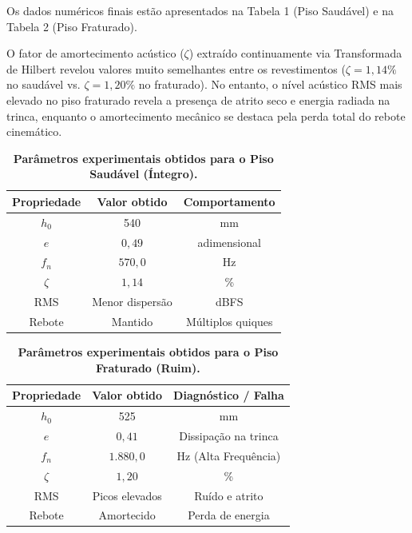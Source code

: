 \documentclass[10pt,twocolumn,fleqn]{article}
\begin{document}
	Os dados numéricos finais estão apresentados na Tabela 1 (Piso Saudável) e na Tabela 2 (Piso Fraturado).
	
	O fator de amortecimento acústico ($\zeta$) extraído continuamente via Transformada de Hilbert revelou valores muito semelhantes entre os revestimentos ($\zeta = 1{,}14\%$ no saudável vs. $\zeta = 1{,}20\%$ no fraturado). No entanto, o nível acústico RMS mais elevado no piso fraturado revela a presença de atrito seco e energia radiada na trinca, enquanto o amortecimento mecânico se destaca pela perda total do rebote cinemático.
	
	\begin{table}[!ht]
		\centering
		\caption{\textbf{Parâmetros experimentais obtidos para o Piso Saudável (Íntegro).}}
		\label{tab:parametros_saudavel}
		\begin{tabular}{c|c|c}
			\hline
			\textbf{Propriedade} & \textbf{Valor obtido} & \textbf{Comportamento}\\
			\hline
			$h_0$ & 540 & mm \\
			$e$ & $0{,}49$ & adimensional \\
			$f_n$ & $570{,}0$ & Hz \\
			$\zeta$ & $1{,}14$ & \% \\
			RMS & Menor dispersão & dBFS \\
			Rebote & Mantido & Múltiplos quiques \\
			\hline
		\end{tabular}
	\end{table}
	
	\begin{table}[!ht]
		\centering
		\caption{\textbf{Parâmetros experimentais obtidos para o Piso Fraturado (Ruim).}}
		\label{tab:parametros_ruim}
		\begin{tabular}{c|c|c}
			\hline
			\textbf{Propriedade} & \textbf{Valor obtido} & \textbf{Diagnóstico / Falha}\\
			\hline
			$h_0$ & 525 & mm \\
			$e$ & $0{,}41$ & Dissipação na trinca \\
			$f_n$ & $1.880{,}0$ & Hz (Alta Frequência) \\
			$\zeta$ & $1{,}20$ & \% \\
			RMS & Picos elevados & Ruído e atrito \\
			Rebote & Amortecido & Perda de energia \\
			\hline
		\end{tabular}
	\end{table}
	
\end{document}
